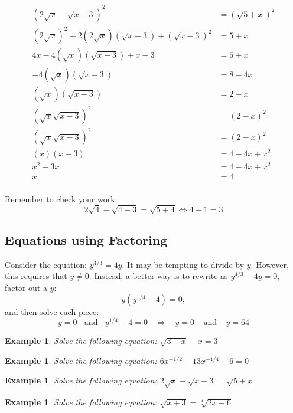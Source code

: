 \documentclass[twoside]{tufte-handout}
\newcounter{ekcounter}%
\theoremstyle{ekimcustom}
\newtheorem{exm}[ekcounter]{Example}
\begin{document}
\begin{align*}
    (2\sqrt{x}-\sqrt{x-3})^2&=(\sqrt{5+x})^2\\
    (2\sqrt{x})^2-2(2\sqrt{x})(\sqrt{x-3})+(\sqrt{x-3})^2&=5+x\\
    4x-4(\sqrt{x})(\sqrt{x-3})+x-3&=5+x\\
    -4(\sqrt{x})(\sqrt{x-3})&=8-4x\\
    (\sqrt{x})(\sqrt{x-3})&=2-x\\
    (\sqrt{x}\sqrt{x-3})^2&=(2-x)^2\\
    (\sqrt{x}\sqrt{x-3})^2&=(2-x)^2\\
    (x)(x-3)&=4-4x+x^2\\
    x^2-3x&=4-4x+x^2\\
    x&=4 \\
\end{align*}

Remember to check your work: 
$$2\sqrt{4}-\sqrt{4-3}=\sqrt{5+4}\Leftrightarrow 4-1=3$$



\subsection{Equations using Factoring}
 Consider the equation: $y^{4/3}=4y$. It may be tempting to divide by $y$. However, this requires that $y\neq 0$. Instead, a better way is to   rewrite as $y^{4/3}-4y=0$, factor out a $y$: $$y(y^{1/4}-4)=0,$$
 and then solve each piece: 
	$$y=0~~~~ \mbox{and} ~~~~y^{1/4}-4=0~~~~\Rightarrow ~~~~  y=0 ~~~~~\mbox{and} ~~~~~y=64$$ 





\everymath{\displaystyle}
\begin{exm}{Solve the following equation: $\sqrt{3-x}-x=3$}
\end{exm}\vskip10pt

\begin{exm}{Solve the following equation: $ 6x^{-1/2}-13x^{-1/4}+6=0  $}
\end{exm}\vskip10pt

\everymath{\displaystyle}
\begin{exm}{Solve the following equation: $ 2\sqrt{x}-\sqrt{x-3}=\sqrt{5+x}    $}
\end{exm}\vskip10pt

\begin{exm}{Solve the following equation: $  \sqrt{x+3}=\sqrt[4]{2x+6} $ }
\end{exm}\vskip10pt
\end{document}
